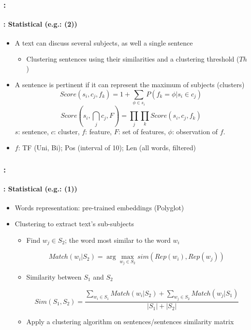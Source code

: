 \documentclass[xcolor=table]{beamer}
\begin{document}
\begin{frame}
	\frametitle{\insertshortsubtitle: \insertsection}
	\framesubtitle{\insertsubsection: Statistical (e.g.: \cite{13-aries-al} (2))}
	
	\begin{itemize}
		\item A text can discuss several subjects, as well a single sentence
		\begin{itemize}
			\item Clustering sentences using their similarities and a clustering threshold ($Th$)
		\end{itemize}
		\item A sentence is pertinent if it can represent the maximum of subjects (clusters)
		\[ Score(s_i , c_j , f_k ) = 1 + \sum_{\phi \in s_i} {P(f_k=\phi | s_i \in c_j)} \]
		\[ Score(s_i , \bigcap_{j} c_j , F) =  %
		\prod_{j} \prod_{k} Score(s_i , c_j , f_k ) \]
		$ s $: sentence, $ c $: cluster, $ f $: feature, $ F $: set of features, $ \phi $: observation of $ f $.
		\item $f$: TF (Uni, Bi); Pos (interval of 10); Len (all words, filtered)
	\end{itemize}
	
\end{frame}

\begin{frame}
	\frametitle{\insertshortsubtitle: \insertsection}
	\framesubtitle{\insertsubsection: Statistical (e.g.: \cite{15-oufaida-al} (1))}
	
	\begin{itemize}
		\item Words representation: pre-trained embeddings (Polyglot)
		\item Clustering to extract text's sub-subjects
		\begin{itemize}
			\item Find $w_j \in S_2$; the word most similar to the word $w_i$
			
			\[Match(w_i | S_2) = \arg\max_{w_j \in S_2} sim(Rep(w_i), Rep(w_j))\]
			
			\item Similarity between $S_1$ and $S_2$
			
			\[Sim(S_1, S_2) = \frac{\sum_{w_i \in S_1} Match(w_i | S_2) + \sum_{w_j \in S_2} Match(w_j | S_1)}{|S_1| + |S_2|}\]
			
			\item Apply a clustering algorithm on sentences/sentences similarity matrix
		\end{itemize}
	\end{itemize}
	
\end{frame}
\end{document}
